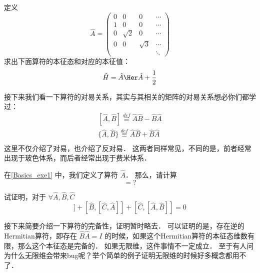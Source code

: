 \begin{exer}{}\label{Basics_exe1}
定义
\begin{equation}
\hat{A} = \left(
\begin{matrix}
0 & 0 & 0 & \cdots \\
1 & 0 & 0 & \cdots \\
0 & \sqrt{2} & 0 & \cdots\\
0 & 0 & \sqrt{3} & \cdots\\
  &  &  &  \ddots
\end{matrix}
\right)
\end{equation}
求出下面算符的本征态和对应的本征值：
\begin{equation}
\hat{H} = \hat{A}\Her\hat{A} + \frac{1}{2}
\end{equation}
\end{exer}

接下来我们看一下算符的对易关系，其实与其相关的矩阵的对易关系想必你们都学过：
\begin{equation}
\begin{split}
[\hat{A},\hat{B}] \overset{def}{\equiv}\hat{A}\hat{B} - \hat{B}\hat{A}\\
\{\hat{A},\hat{B}\} \overset{def}{\equiv}\hat{A}\hat{B} + \hat{B}\hat{A}\\
\end{split}
\end{equation}
这里不仅介绍了对易，也介绍了反对易． 这两者同样常见，不同的是，前者经常出现于玻色体系，而后者经常出现于费米体系．

\begin{exer}{}
在\autoref{Basics_exe1} 中，我们定义了算符 $\hat{A}$． 那么，请计算
\begin{equation}
[\hat{A},\hat{A}\Her] = ?
\end{equation}
\end{exer}{}

\begin{exer}{}
试证明，对于 $\forall \hat{A}, \hat{B}, \hat{C}$
\begin{equation}
[\hat{A},[\hat{B},\hat{C}]] + [\hat{B},[\hat{C},\hat{A}]] + [\hat{C},[\hat{A},\hat{B}]] = 0
\end{equation}
\end{exer}{}

接下来简要介绍一下算符的完备性，证明暂时略去． 可以证明的是，存在逆的Hermitian算符，即存在 $\hat{B}\hat{A} = I$ 的时候，如果这个Hermitian算符的本征态维数有限，那么这个本征态是完备的． 如果无限维，这件事情不一定成立． 至于有人问为什么无限维会带来bug呢？举个简单的例子证明无限维的时候好多概念都用不了．

